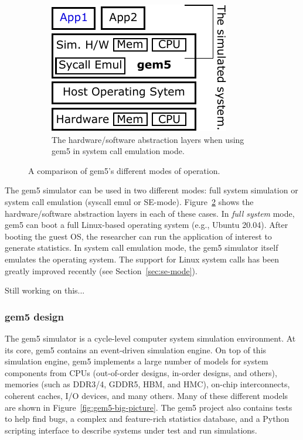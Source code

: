 \begin{figure}
  \hfill
  \begin{subfigure}{0.28\linewidth}
    \centering
    \includegraphics[width=\linewidth]{fig/gem5-fs-se}
    \caption{The hardware/software abstraction layers when using gem5 in system call emulation mode.}
    \label{fig:gem5-fs-se}
  \end{subfigure}
  \caption{A comparison of gem5's different modes of operation.}
  \label{fig:gem5-fs}
\end{figure}

The gem5 simulator can be used in two different modes: full system simulation or system call emulation (syscall emul or SE-mode).
Figure~\ref{fig:gem5-fs} shows the hardware/software abstraction layers in each of these cases.
In \emph{full system} mode, gem5 can boot a full Linux-based operating system (e.g., Ubuntu 20.04).
After booting the guest OS, the researcher can run the application of interest to generate statistics.
In system call emulation mode, the gem5 simulator itself emulates the operating system.
The support for Linux system calls has been greatly improved recently (see Section~\ref{sec:se-mode}).

Still working on this...

\subsubsection{gem5 design}

The gem5 simulator is a cycle-level computer system simulation environment.
At its core, gem5 contains an event-driven simulation engine.
On top of this simulation engine, gem5 implements a large number of models for system components from CPUs (out-of-order designs, in-order designs, and others), memories (such as DDR3/4, GDDR5, HBM, and HMC), on-chip interconnects, coherent caches, I/O devices, and many others.
Many of these different models are shown in Figure~\ref{fig:gem5-big-picture}.
The gem5 project also contains tests to help find bugs, a complex and feature-rich statistics database, and a Python scripting interface to describe systems under test and run simulations.

